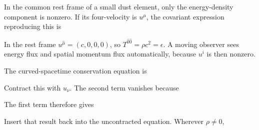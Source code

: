 \documentclass[
  11pt,
  letterpaper,
  oneside,
  openany]{scrbook}
\begin{document}
In the common rest frame of a small dust element, only the
energy-density component is nonzero. If its four-velocity is \(u^\mu\),
the covariant expression reproducing this is

\begin{center}
\begingroup
{}
\ifdim\wd\grmathbox>\linewidth
\resizebox{\linewidth}{!}{\usebox{\grmathbox}}
\else\usebox{\grmathbox}\fi
\endgroup
\end{center}

In the rest frame \(u^{\hat\mu}=(c,0,0,0)\), so
\(T^{\hat0\hat0}=\rho c^2=\epsilon\). A moving observer sees energy flux
and spatial momentum flux automatically, because \(u^i\) is then
nonzero.

The curved-spacetime conservation equation is

\begin{center}
\begingroup
{}
\ifdim\wd\grmathbox>\linewidth
\resizebox{\linewidth}{!}{\usebox{\grmathbox}}
\else\usebox{\grmathbox}\fi
\endgroup
\end{center}

Contract this with \(u_\nu\). The second term vanishes because

\begin{center}
\begingroup
{}
\ifdim\wd\grmathbox>\linewidth
\resizebox{\linewidth}{!}{\usebox{\grmathbox}}
\else\usebox{\grmathbox}\fi
\endgroup
\end{center}

The first term therefore gives

\begin{center}
\begingroup
{}
\ifdim\wd\grmathbox>\linewidth
\resizebox{\linewidth}{!}{\usebox{\grmathbox}}
\else\usebox{\grmathbox}\fi
\endgroup
\end{center}

Insert that result back into the uncontracted equation. Wherever
\(\rho\ne0\),
\end{document}
